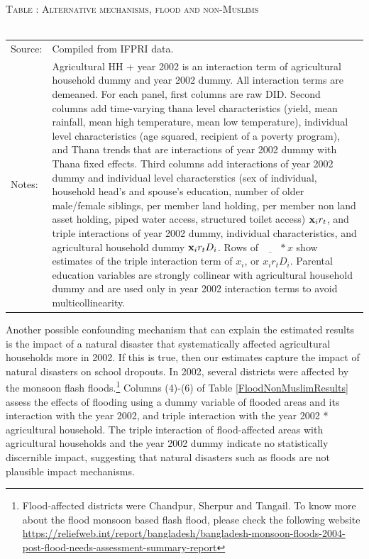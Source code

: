 \documentclass[12pt,letterpaper]{article}
\newcommand{\bfx}{\ensuremath{\mbox{\bf x}}}
\newcommand{\0}{\ensuremath{\mbox{\boldmath $0$}}}
\begin{document}
\begin{table}\hfil\textsc{\footnotesize Table \thetable: Alternative mechanisms, flood and non-Muslims\label{FloodNonMuslimResultsConcise}}\\\setlength{\tabcolsep}{.5pt}\renewcommand{\arraystretch}{.675}\hspace{-2em}\hfil\\\renewcommand{\arraystretch}{1}\hfil\begin{tabular}{>{\hfill\scriptsize}p{1cm}<{}>{\scriptsize}p{12cm}<{\hfill}} Source:& Compiled from IFPRI data. \\[-1ex] Notes:&   \textsf{Agricultural HH + year 2002} is an interaction term of agricultural household dummy and year 2002 dummy. All interaction terms are demeaned. For each panel, first columns are raw DID. Second columns add time-varying thana level characteristics (yield, mean rainfall, mean high temperature, mean low temperature), individual level characteristics (age squared, recipient of a poverty program), and \textsf{Thana trends} that are interactions of year 2002 dummy with Thana fixed effects. Third columns add interactions of year 2002 dummy and individual level characterstics (sex of individual, household head's and spouse's education, number of older male/female siblings, per member land holding, per member non land asset holding, piped water access, structured toilet access) $\bfx_{i}r_{t}$, and triple interactions of year 2002 dummy, individual characteristics, and agricultural household dummy $\bfx_{i}r_{t}D_{i}$. Rows of $\underline{\phantom{mm}}*x$ show estimates of the triple interaction term of $x_{i}$, or $x_{i}r_{t}D_{i}$. Parental education variables are strongly collinear with agricultural household dummy and are used only in year 2002 interaction terms to avoid multicollinearity.   \end{tabular} \end{table}


Another possible confounding mechanism that can explain the estimated results is the impact of a natural disaster that systematically affected agricultural households more in 2002. If this is true, then our estimates capture the impact of natural disasters on school dropouts. In 2002, several districts were affected by the monsoon flash floods.\footnote{Flood-affected districts were Chandpur, Sherpur and Tangail. To know more about the flood monsoon based flash flood, please check the following website \url{https://reliefweb.int/report/bangladesh/bangladesh-monsoon-floods-2004-post-flood-needs-assessment-summary-report} } Columns (4)-(6) of Table \ref{FloodNonMuslimResults} assess the effects of flooding using a dummy variable of flooded areas and its interaction with the year 2002, and triple interaction with the year 2002 * agricultural household. The triple interaction of flood-affected areas with agricultural households and the year 2002 dummy indicate no statistically discernible impact, suggesting that natural disasters such as floods are not plausible impact mechanisms.
\end{document}
